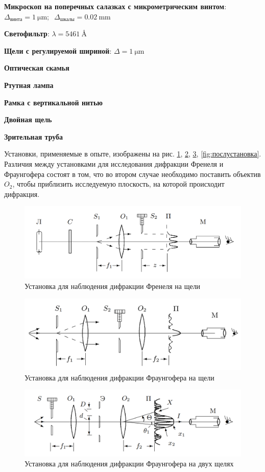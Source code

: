 \documentclass[a4paper]{article}
\newcommand{\equip}[1]{
	
	{\bf #1}}
\begin{document}
\equip{Микроскоп на поперечных салазках с микрометрическим винтом}: $ \Delta_{винта} = \SI{1}{\micro \metre}; \;\; \Delta_{шкалы} = \SI{0.02}{\milli \metre} $
\equip{Светофильтр}: $ \lambda = \SI{5461}{\angstrom}$
\equip{Щели с регулируемой шириной}: $ \Delta = \SI{1}{\micro \metre} $
\equip{Оптическая скамья}
\equip{Ртутная лампа}
\equip{Рамка с вертикальной нитью}
\equip{Двойная щель}
\equip{Зрительная труба}

Установки, применяемые в опыте, изображены на рис. \ref{fig:дифракцияФренеляУстановка}, \ref{fig:Фраунгофер}, \ref{fig:Фраунгофер2}, \ref{fig:послустановка}. Различия между установками для исследования дифракции Френеля и Фраунгофера состоят в том, что во втором случае необходимо поставить объектив $ O_2 $, чтобы приблизить исследуемую плоскость, на которой происходит дифракция.

\begin{figure}[tbp]
	\centering
	\includegraphics[width=0.8\linewidth]{Screenshot_2}
	\caption{Установка для наблюдения дифракции Френеля на щели}
	\label{fig:дифракцияФренеляУстановка}
\end{figure}


\begin{figure}[tbp]
	\centering
	\includegraphics[width=0.8\linewidth]{Screenshot_3}
	\caption{Установка для наблюдения дифракции Фраунгофера на щели}
	\label{fig:Фраунгофер}
\end{figure}

\begin{figure}[tbp]
	\centering
	\includegraphics[width=0.8\linewidth]{Screenshot_4}
	\caption{Установка для наблюдения дифракции Фраунгофера на двух щелях}
	\label{fig:Фраунгофер2}
\end{figure}
\end{document}
